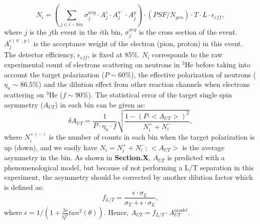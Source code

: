  \begin{equation}
     N_{i} = (\sum_{j\in i-bin} \sigma^{avg}_{j}\cdot A^{e}_{j} \cdot A^{\pi^{-}}_{j} \cdot A^{p}_{j}) \cdot (PSF/N_{gen}) \cdot T \cdot L \cdot \epsilon_{eff},
     \label{ncount}
 \end{equation}
 where $j$ is the $j$th event in the $i$th bin, $\sigma^{avg}_{j}$ is the cross section of the event. $A^{e(\pi^{-},p)}_{j}$ is the acceptance weight of the electron (pion, proton) in this event. The detector efficiency, $\epsilon_{eff}$, is fixed at 85\%. $N_{i}$ corresponds to the raw experimental count of electrons scattering on neutrons in $\mathrm{^{3}He}$ before taking into account the target polarization ($P\sim60\%$), the effective polarization of neutrons ($\eta_{n}\sim86.5\%$) and the dilution effect from other reaction channels when electrons scattering on $\mathrm{^{3}He}$ ($f \sim 90\%$). The statistical error of the target single spin asymmetry ($A_{UT}$) in each bin can be given as:
  \begin{equation}
    \delta A_{UT} = \frac{1}{P\cdot\eta_{n}\cdot f} \sqrt{\frac{1-(P\cdot <A_{UT}>)^{2}}{N^{+}_{i}+N^{-}_{i}}},
    \label{stat_err}
 \end{equation}
 where $N^{+(-)}_{i}$ is the number of counts in each bin when the target polarization is up (down), and we easily have $N_{i}=N^{+}_{i}+N^{-}_{i}$; $<A_{UT}>$ is the average asymmetry in the bin. As shown in {\bf Section.X},  $A_{UT}$ is predicted with a phenomenological model, but because of not performing a L/T separation in this experiment, the asymmetry should be corrected by another dilution factor which is defined as:
\begin{equation}
  f_{L/T} =\frac{\epsilon\cdot\sigma_{L} }{\sigma_{T}+\epsilon\cdot\sigma_{L} },
\end{equation} 
where $\epsilon=1/(1+\frac{2\nu}{Q^{2}}tan^{2}(\theta))$. Hence, $A_{UT} = f_{L/T}\cdot A_{UT}^{model}$.

